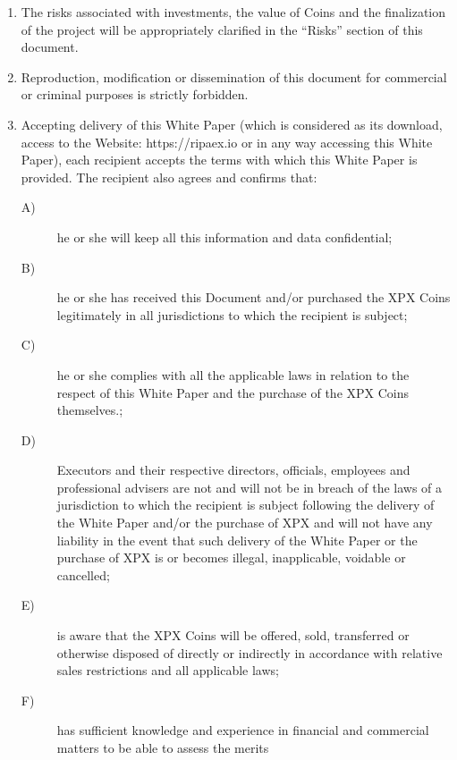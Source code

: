 \documentclass[11pt,fleqn,oneside]{book} %
\begin{document}
\begin{scriptsize}
{\begin{enumerate}
			which have been written using as an example the
			laws governing the publication of texts and documents in
			Europe at the time of publication. Such documents may
			not be approved or comply with the laws of SUPPORTERS’
			states, in which case a lawyer should be consulted for
			further information regarding the structured rules of this
			TEC and the international laws to which it will be submitted
			once it is launched.
			\item The risks associated with investments, the value of Coins
			and the finalization of the project will be appropriately
			clarified in the “Risks” section of this document.
			\item Reproduction, modification or dissemination of this
			document for commercial or criminal purposes is strictly
			forbidden.
			\item Accepting delivery of this White Paper (which is considered
			as its download, access to the Website: https://ripaex.io or 
			in any way accessing this White Paper), each recipient
			accepts the terms with which this White Paper is provided.
			The recipient also agrees and confirms that:
			\begin{description}
			\item[A)] he or she will keep all this information and data confidential;
			\item[B)] he or she has received this Document and/or purchased
			the XPX Coins legitimately in all jurisdictions to
			which the recipient is subject;
			\item[C)] he or she complies with all the applicable laws in relation
			to the respect of this White Paper and the purchase
			of the XPX Coins themselves.;
			\item[D)] Executors and their respective directors, officials,
			employees and professional advisers are not and will
			not be in breach of the laws of a jurisdiction to which the
			recipient is subject following the delivery of the White
			Paper and/or the purchase of XPX and will not have any
			liability in the event that such delivery of the White Paper
			or the purchase of XPX is or becomes illegal, inapplicable,
			voidable or cancelled;
			\item[E)] is aware that the XPX Coins will be offered, sold,
			transferred or otherwise disposed of directly or indirectly
			in accordance with relative sales restrictions and all applicable
			laws;
			\item[F)] has sufficient knowledge and experience in financial
			and commercial matters to be able to assess the merits

\end{description}
\end{enumerate}}
\end{scriptsize}
\end{document}
